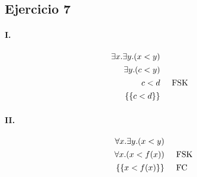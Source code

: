 \documentclass[10pt,a4paper]{article}
\begin{document}
\subsection{Ejercicio 7}
\begin{multicols}{2}
\paragraph{I.} 
\begin{align*}
\exists x. \exists y. (x<y) \\[1pt]
\exists y. (c<y) \\[1pt]
c<d &\hspace{5mm}\text{FSK}\\[1pt]
\{\{c<d\}\}
\end{align*}
\vfill\null
\paragraph{II.}
\begin{align*}
\forall x. \exists y. (x<y) & \\[1pt]
\forall x. (x<f(x)) &\hspace{5mm}\text{FSK} \\[1pt]
\{\{x<f(x)\}\} &\hspace{5mm}\text{FC}
\end{align*}
\vfill\null
\end{multicols}
\end{document}
